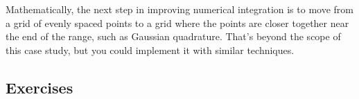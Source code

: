 \begin{Shaded}
\begin{Highlighting}[]
\StringTok{ } \NormalTok{) \{}
  \StringTok{ }\StringTok{ }

    \StringTok{ }\StringTok{ }\StringTok{ }\StringTok{ }\StringTok{ }
    \StringTok{ }\NormalTok{(}\NormalTok{(}\NormalTok{, }\StringTok{ }\NormalTok{))}

    \StringTok{ }\StringTok{ }\StringTok{ }\NormalTok{(}\StringTok{ }
  \NormalTok{\}}
\NormalTok{\}}

\StringTok{ }\NormalTok{(}\NormalTok{(}\NormalTok{, }\NormalTok{, }\NormalTok{, }\NormalTok{, }\NormalTok{))}
\StringTok{ }\NormalTok{(}\NormalTok{(}\NormalTok{, -}\NormalTok{, }\NormalTok{), } \NormalTok{)}
 \NormalTok{, } 
\end{Highlighting}
\end{Shaded}

Mathematically, the next step in improving numerical integration is to
move from a grid of evenly spaced points to a grid where the points are
closer together near the end of the range, such as Gaussian quadrature.
That's beyond the scope of this case study, but you could implement it
with similar techniques.

\subsection{Exercises}


